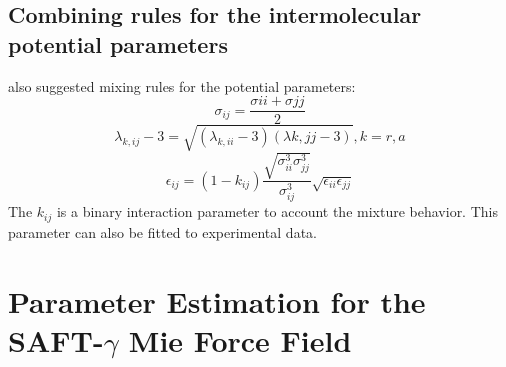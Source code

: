 \subsection{Combining rules for the intermolecular potential parameters}
 also suggested mixing rules for the potential parameters:
\begin{equation}
\sigma_{ij} =\frac{\sigma{ii}+\sigma{jj}}{2}
\label{eqn:sigmamix}
\end{equation}
\begin{equation}
\lambda_{k,ij} -3 =\sqrt{(\lambda_{k,ii}-3)(\lambda{k,jj}-3)} , k=r,a
\label{eqn:lambdamix}
\end{equation}
\begin{equation}
\epsilon_{ij} =(1-k_{ij})\frac{\sqrt{\sigma_{ii}^{3}\sigma_{jj}^{3}}}{\sigma_{ij}^{3}}\sqrt{\epsilon_{ii}\epsilon_{jj}}
\label{eqn:epsmix}
\end{equation}
The $k_{ij}$ is a binary interaction parameter to account the mixture behavior. This parameter can also be fitted to experimental data.

\section{Parameter Estimation for the SAFT-$\gamma$ Mie Force Field}

